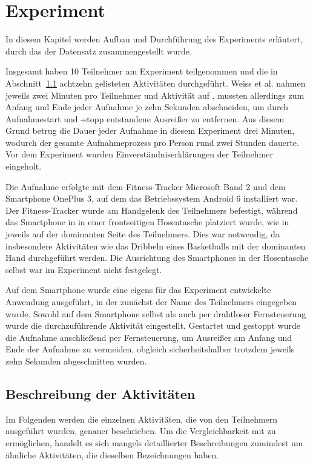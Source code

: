 \chapter{Experiment}
\label{chap:experiment}
In diesem Kapitel werden Aufbau und Durchführung des Experiments erläutert, durch das der Datensatz zusammengestellt wurde.

Insgesamt haben 10 Teilnehmer am Experiment teilgenommen und die in Abschnitt~\ref{sec:activities} achtzehn gelisteten Aktivitäten durchgeführt. Weiss et al. nahmen jeweils zwei Minuten pro Teilnehmer und Aktivität auf \cite{Weiss2016}, mussten allerdings zum Anfang und Ende jeder Aufnahme je zehn Sekunden abschneiden, um durch Aufnahmestart und -stopp entstandene Ausreißer zu entfernen. Aus diesem Grund betrug die Dauer jeder Aufnahme in diesem Experiment drei Minuten, wodurch der gesamte Aufnahmeprozess pro Person rund zwei Stunden dauerte. Vor dem Experiment wurden Einverständniserklärungen der Teilnehmer eingeholt.

Die Aufnahme erfolgte mit dem Fitness-Tracker Microsoft Band 2 und dem Smartphone OnePlus 3, auf dem das Betriebssystem Android 6 installiert war. Der Fitness-Tracker wurde am Handgelenk des Teilnehmers befestigt, während das Smartphone in in einer frontseitigen Hosentasche platziert wurde, wie in \cite{Weiss2016} jeweils auf der dominanten Seite des Teilnehmers. Dies war notwendig, da insbesondere Aktivitäten wie das Dribbeln eines Basketballs mit der dominanten Hand durchgeführt werden. Die Ausrichtung des Smartphones in der Hosentasche selbst war im Experiment nicht festgelegt.

Auf dem Smartphone wurde eine eigens für das Experiment entwickelte Anwendung ausgeführt, in der zunächst der Name des Teilnehmers eingegeben wurde. Sowohl auf dem Smartphone selbst als auch per drahtloser Fernsteuerung wurde die durchzuführende Aktivität eingestellt. Gestartet und gestoppt wurde die Aufnahme anschließend per Fernsteuerung, um Ausreißer am Anfang und Ende der Aufnahme zu vermeiden, obgleich sicherheitshalber trotzdem jeweils zehn Sekunden abgeschnitten wurden.

\section{Beschreibung der Aktivitäten}
\label{sec:activities}
Im Folgenden werden die einzelnen Aktivitäten, die von den Teilnehmern ausgeführt wurden, genauer beschrieben. Um die Vergleichbarkeit mit \cite{Weiss2016} zu ermöglichen, handelt es sich mangels detaillierter Beschreibungen zumindest um ähnliche Aktivitäten, die dieselben Bezeichnungen haben.

